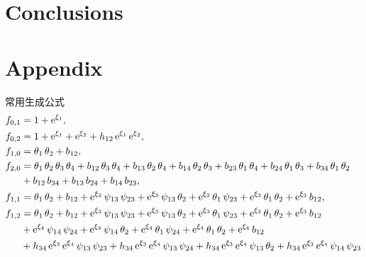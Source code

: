 \documentclass[12pt,a4paper,UTF8]{article}
\numberwithin{equation}{section}
\begin{document}
\section{Conclusions}\label{conclusion}

\newpage 
\section*{Appendix}
常用生成公式
\begin{equation*}
\begin{aligned}
f_{0,1}&=1+{\rm e}^{{{\xi}_{1}}} ,\\ 
f_{0,2}&=1+{\rm e}^{{{\xi}_{1}}}+{\rm e}^{{{\xi}_{2}}}+{{h}_{12}}\,{\rm e}^{{{\xi}_{1}}}\,{\rm e}^{{{\xi}_{2}}} ,\\ 
f_{1,0}&={{\theta}_{1}}\,{{\theta}_{2}}+{{b}_{12}} ,\\ 
f_{2,0}&={{\theta}_{1}}\,{{\theta}_{2}}\,{{\theta}_{3}}\,{{\theta}_{4}}+{{b}_{12}}\,{{\theta}_{3}}\,{{\theta}_{4}}+{{b}_{13}}\,{{\theta}_{2}}\,{{\theta}_{4}}+{{b}_{14}}\,{{\theta}_{2}}\,{{\theta}_{3}}+{{b}_{23}}\,{{\theta}_{1}}\,{{\theta}_{4}}+{{b}_{24}}\,{{\theta}_{1}}\,{{\theta}_{3}}+{{b}_{34}}\,{{\theta}_{1}}\,{{\theta}_{2}} \\
&+{{b}_{12}}\,{{b}_{34}}+{{b}_{13}}\,{{b}_{24}}+{{b}_{14}}\,{{b}_{23}} ,\\ 
f_{1,1}&={{\theta}_{1}}\,{{\theta}_{2}}+{{b}_{12}}+{\rm e}^{{{\xi}_{3}}}\,{{\psi}_{13}}\,{{\psi}_{23}}+{\rm e}^{{{\xi}_{3}}}\,{{\psi}_{13}}\,{{\theta}_{2}}+{\rm e}^{{{\xi}_{3}}}\,{{\theta}_{1}}\,{{\psi}_{23}}+{\rm e}^{{{\xi}_{3}}}\,{{\theta}_{1}}\,{{\theta}_{2}}+{\rm e}^{{{\xi}_{3}}}\,{{b}_{12}} ,\\
f_{1,2}&={{\theta}_{1}}\,{{\theta}_{2}}+{{b}_{12}}+{\rm e}^{{{\xi}_{3}}}\,{{\psi}_{13}}\,{{\psi}_{23}}+{\rm e}^{{{\xi}_{3}}}\,{{\psi}_{13}}\,{{\theta}_{2}}+{\rm e}^{{{\xi}_{3}}}\,{{\theta}_{1}}\,{{\psi}_{23}}+{\rm e}^{{{\xi}_{3}}}\,{{\theta}_{1}}\,{{\theta}_{2}}+{\rm e}^{{{\xi}_{3}}}\,{{b}_{12}}\\ 
&+{\rm e}^{{{\xi}_{4}}}\,{{\psi}_{14}}\,{{\psi}_{24}}+{\rm e}^{{{\xi}_{4}}}\,{{\psi}_{14}}\,{{\theta}_{2}}+{\rm e}^{{{\xi}_{4}}}\,{{\theta}_{1}}\,{{\psi}_{24}}+{\rm e}^{{{\xi}_{4}}}\,{{\theta}_{1}}\,{{\theta}_{2}}+{\rm e}^{{{\xi}_{4}}}\,{{b}_{12}}\\
&+{{h}_{34}}\,{\rm e}^{{{\xi}_{3}}}\,{\rm e}^{{{\xi}_{4}}}\,{{\psi}_{13}}\,{{\psi}_{23}}+{{h}_{34}}\,{\rm e}^{{{\xi}_{3}}}\,{\rm e}^{{{\xi}_{4}}}\,{{\psi}_{13}}\,{{\psi}_{24}}+{{h}_{34}}\,{\rm e}^{{{\xi}_{3}}}\,{\rm e}^{{{\xi}_{4}}}\,{{\psi}_{13}}\,{{\theta}_{2}}+{{h}_{34}}\,{\rm e}^{{{\xi}_{3}}}\,{\rm e}^{{{\xi}_{4}}}\,{{\psi}_{14}}\,{{\psi}_{23}}\\

\end{aligned}
\end{equation*}
\end{document}
